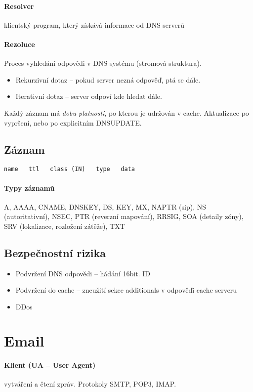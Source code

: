\documentclass[a4wide]{report}
\begin{document}
\paragraph{Resolver}
klientský program, který získává informace od DNS serverů

\paragraph{Rezoluce}
Proces vyhledání odpovědi v DNS systému (stromová struktura).
\begin{itemize}
	\item Rekurzivní dotaz -- pokud server nezná odpověď, ptá se dále.
	\item Iterativní dotaz -- server odpoví kde hledat dále.
\end{itemize}

Každý záznam má \emph{dobu platnosti}, po kterou je udržován v cache. Aktualizace po vypršení, nebo po explicitním DNSUPDATE.

\subsection{Záznam}

\verb|name   ttl   class (IN)   type   data|

\paragraph{Typy záznamů}
A, AAAA, CNAME, DNSKEY, DS, KEY, MX, NAPTR (sip), NS (autoritativní), NSEC, PTR (reverzní mapování), RRSIG, SOA (detaily zóny), SRV (lokalizace, rozložení zátěže), TXT

\subsection{Bezpečnostní rizika}
\begin{itemize}
	\item Podvržení DNS odpovědi -- hádání 16bit. ID
	\item Podvržení do cache -- zneužití sekce additionals v odpověďi cache serveru
	\item DDos
\end{itemize}


\section{Email}

\paragraph{Klient (UA -- User Agent)} vytváření a čtení zpráv. Protokoly SMTP, POP3, IMAP.
\end{document}
